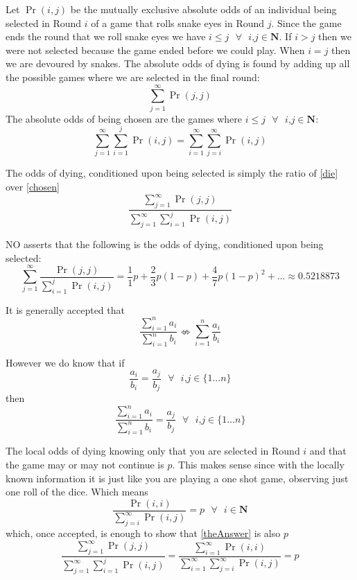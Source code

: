 \documentclass[12pt, letterpaper]{article}
\begin{document}
Let $\Pr(i,j)$ be the mutually exclusive absolute odds of an individual being selected in Round $i$ of a game that rolls snake eyes in Round $j$. Since the game ends the round that we roll snake eyes we have $i\leq j \text{ }\forall \text{ } i\text{,}j \in \mathbf{N}$. If $i > j$ then we were not selected because the game ended before we could play. When $i=j$ then we are devoured by snakes.
The absolute odds of dying is found by adding up all the possible games where we are selected in the final round:
\begin{equation}
    \sum_{j=1}^{\infty} \Pr(j,j) \label{die}
\end{equation} 
The absolute odds of being chosen are the games where  $i\leq j \text{ }\forall \text{ } i\text{,}j \in \mathbf{N}$:
\begin{equation}
   \sum_{j=1}^{\infty} \sum_{i=1}^{j} \Pr(i,j) = \sum_{i=1}^{\infty} \sum_{j=i}^{\infty} \Pr(i,j) \label{chosen} 
\end{equation}

The odds of dying, conditioned upon being selected is simply the ratio of \ref{die} over \ref{chosen}
\begin{equation}
    \frac{\sum_{j=1}^{\infty} \Pr(j,j)}{\sum_{j=1}^{\infty} \sum_{i=1}^{j} \Pr(i,j)}\label{theAnswer}
\end{equation}

NO asserts that the following is the odds of dying, conditioned upon being selected:
$$\sum_{j=1}^{\infty} \frac{\Pr(j,j)}{\sum_{i=1}^{j} \Pr(i,j)} = \frac{1}{1}p + \frac{2}{3}p(1-p) + \frac{4}{7}p(1-p)^2 + ... \approx 0.5218873$$

It is generally accepted that 
$$\frac{\sum_{i=1}^{n} a_i}{\sum_{i=1}^{n} b_i}\nLeftrightarrow \sum_{i=1}^{n} \frac{a_i}{b_i}$$

However we do know that if 
$$\frac{a_i}{b_i}=\frac{a_j}{b_j} \text{   } \forall \text{ } i\text{,}j \in \{1...n\}$$
then
$$\frac{\sum_{i=1}^{n} a_i}{\sum_{i=1}^{n} b_i} = \frac{a_j}{b_j}\text{   } \forall \text{ } i\text{,}j \in \{1...n\}$$

The local odds of dying knowing only that you are selected in Round $i$ and that the game may or may not continue is $p$.  This makes sense since with the locally known information it is just like you are playing a one shot game, observing just one roll of the dice.  Which means
$$\frac{\Pr(i,i)}{\sum_{j=i}^{\infty}\Pr(i,j)} = p \text{  }\forall \text{  } i \in \mathbf{N}$$
which, once accepted, is enough to show that \ref{theAnswer} is also $p$
$$ \frac{\sum_{j=1}^{\infty} \Pr(j,j)}{\sum_{j=1}^{\infty} \sum_{i=1}^{j} \Pr(i,j)} = \frac{\sum_{i=1}^{\infty}\Pr(i,i)}{\sum_{i=1}^{\infty}\sum_{j=i}^{\infty}\Pr(i,j)} = p $$
\end{document}
